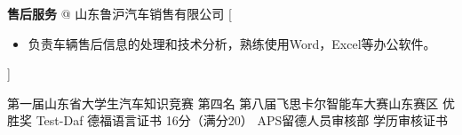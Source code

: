 \documentclass[zh]{resume}
\begin{document}
\begin{spacing}{1.6}
	\begin{experiences}
		{{\large \textbf{售后服务} @ 山东鲁沪汽车销售有限公司}}%
		[\begin{itemize}
			\item {\large 负责车辆售后信息的处理和技术分析，熟练使用Word，Excel等办公软件。}
		\end{itemize}]
	\end{experiences}
\end{spacing}
\begin{spacing}{1.6}
	\begin{entries}
		{{\large 第一届山东省大学生汽车知识竞赛 \textbullet 第四名}}
		{{\large 第八届飞思卡尔智能车大赛山东赛区 \textbullet 优胜奖} }
		{{\large Test-Daf 德福语言证书 \textbullet 16分（满分20}）}
		{{\large APS留德人员审核部 \textbullet 学历审核证书}}
	\end{entries}
\end{spacing}
\end{document}
